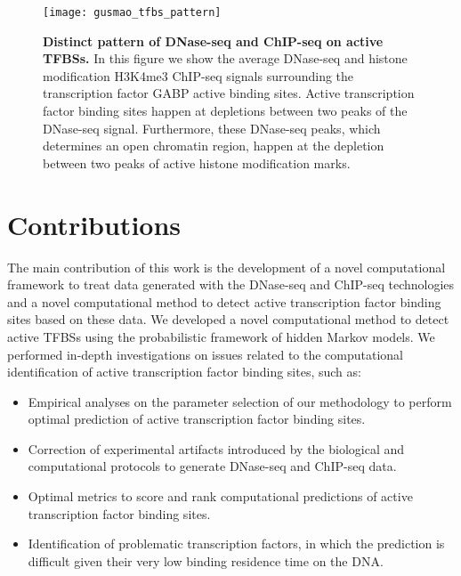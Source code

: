 \begin{figure}[h!]
\centering
\texttt{[image: gusmao\_tfbs\_pattern]}
\caption[Distinctive pattern of DNase-seq and ChIP-seq on active TFBSs]{\textbf{Distinct pattern of DNase-seq and ChIP-seq on active TFBSs.} In this figure we show the average DNase-seq and histone modification H3K4me3 ChIP-seq signals surrounding the transcription factor GABP active binding sites. Active transcription factor binding sites happen at depletions between two peaks of the DNase-seq signal. Furthermore, these DNase-seq peaks, which determines an open chromatin region, happen at the depletion between two peaks of active histone modification marks.}
\label{fig:gusmao_tfbs_pattern}
\end{figure}

\section{Contributions}
\label{sec:contributions}

The main contribution of this work is the development of a novel computational framework to treat data generated with the DNase-seq and ChIP-seq technologies and a novel computational method to detect active transcription factor binding sites based on these data. We developed a novel computational method to detect active TFBSs using the probabilistic framework of hidden Markov models. We performed in-depth investigations on issues related to the computational identification of active transcription factor binding sites, such as:

\begin{itemize}
\item Empirical analyses on the parameter selection of our methodology to perform optimal prediction of active transcription factor binding sites.
\item Correction of experimental artifacts introduced by the biological and computational protocols to generate DNase-seq and ChIP-seq data.
\item Optimal metrics to score and rank computational predictions of active transcription factor binding sites.
\item Identification of problematic transcription factors, in which the prediction is difficult given their very low binding residence time on the DNA.
\end{itemize}

